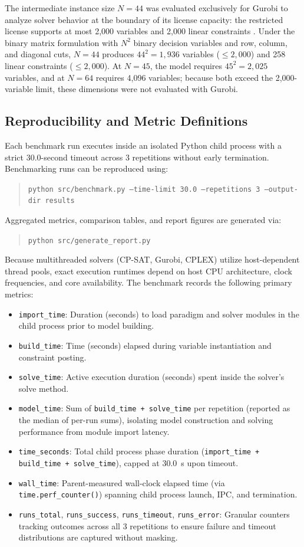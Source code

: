 \documentclass[a4paper,fleqn]{cas-sc}
\begin{document}
The intermediate instance size $N = 44$ was evaluated exclusively for Gurobi to analyze solver behavior at the boundary of its license capacity: the restricted license supports at most 2,000 variables and 2,000 linear constraints \citep{gurobi_sizelimit}. Under the binary matrix formulation with $N^2$ binary decision variables and row, column, and diagonal cuts, $N = 44$ produces $44^2 = 1,936$ variables ($\le 2,000$) and 258 linear constraints ($\le 2,000$). At $N = 45$, the model requires $45^2 = 2,025$ variables, and at $N = 64$ requires 4,096 variables; because both exceed the 2,000-variable limit, these dimensions were not evaluated with Gurobi.

\subsection{Reproducibility and Metric Definitions}
Each benchmark run executes inside an isolated Python child process with a strict 30.0-second timeout across 3 repetitions without early termination. Benchmarking runs can be reproduced using:
\begin{quote}
\texttt{python src/benchmark.py --time-limit 30.0 --repetitions 3 --output-dir results}
\end{quote}
Aggregated metrics, comparison tables, and report figures are generated via:
\begin{quote}
\texttt{python src/generate\_report.py}
\end{quote}
Because multithreaded solvers (CP-SAT, Gurobi, CPLEX) utilize host-dependent thread pools, exact execution runtimes depend on host CPU architecture, clock frequencies, and core availability. The benchmark records the following primary metrics:
\begin{itemize}
    \item \texttt{import\_time}: Duration (seconds) to load paradigm and solver modules in the child process prior to model building.
    \item \texttt{build\_time}: Time (seconds) elapsed during variable instantiation and constraint posting.
    \item \texttt{solve\_time}: Active execution duration (seconds) spent inside the solver's solve method.
    \item \texttt{model\_time}: Sum of \texttt{build\_time + solve\_time} per repetition (reported as the median of per-run sums), isolating model construction and solving performance from module import latency.
    \item \texttt{time\_seconds}: Total child process phase duration (\texttt{import\_time + build\_time + solve\_time}), capped at 30.0~s upon timeout.
    \item \texttt{wall\_time}: Parent-measured wall-clock elapsed time (via \texttt{time.perf\_counter()}) spanning child process launch, IPC, and termination.
    \item \texttt{runs\_total}, \texttt{runs\_success}, \texttt{runs\_timeout}, \texttt{runs\_error}: Granular counters tracking outcomes across all 3 repetitions to ensure failure and timeout distributions are captured without masking.
\end{itemize}
\end{document}
